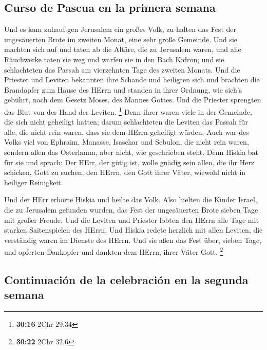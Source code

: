 \hypertarget{curso-de-pascua-en-la-primera-semana}{%
\subsection{Curso de Pascua en la primera
semana}\label{curso-de-pascua-en-la-primera-semana}}

 Und es kam zuhauf gen Jerusalem ein großes Volk, zu
halten das Fest der ungesäuerten Brote im zweiten Monat, eine sehr große
Gemeinde.  Und sie machten sich auf und taten ab die
Altäre, die zu Jerusalem waren, und alle Räuchwerke taten sie weg und
warfen sie in den Bach Kidron;  und sie schlachteten das
Passah am vierzehnten Tage des zweiten Monats. Und die Priester und
Leviten bekannten ihre Schande und heiligten sich und brachten die
Brandopfer zum Hause des HErrn  und standen in ihrer
Ordnung, wie sich's gebührt, nach dem Gesetz Moses, des Mannes Gottes.
Und die Priester sprengten das Blut von der Hand der Leviten.
\footnote{\textbf{30:16} 2Chr 29,34}  Denn ihrer waren
viele in der Gemeinde, die sich nicht geheiligt hatten; darum
schlachteten die Leviten das Passah für alle, die nicht rein waren, dass
sie dem HErrn geheiligt würden.  Auch war des Volks viel
von Ephraim, Manasse, Isaschar und Sebulon, die nicht rein waren,
sondern aßen das Osterlamm, aber nicht, wie geschrieben steht. Denn
Hiskia bat für sie und sprach: Der HErr, der gütig ist, wolle gnädig
sein  allen, die ihr Herz schicken, Gott zu suchen, den
HErrn, den Gott ihrer Väter, wiewohl nicht in heiliger Reinigkeit.

 Und der HErr erhörte Hiskia und heilte das Volk.
 Also hielten die Kinder Israel, die zu Jerusalem
gefunden wurden, das Fest der ungesäuerten Brote sieben Tage mit großer
Freude. Und die Leviten und Priester lobten den HErrn alle Tage mit
starken Saitenspielen des HErrn.  Und Hiskia redete
herzlich mit allen Leviten, die verständig waren im Dienste des HErrn.
Und sie aßen das Fest über, sieben Tage, und opferten Dankopfer und
dankten dem HErrn, ihrer Väter Gott. \footnote{\textbf{30:22} 2Chr 32,6}

\hypertarget{continuaciuxf3n-de-la-celebraciuxf3n-en-la-segunda-semana}{%
\subsection{Continuación de la celebración en la segunda
semana}\label{continuaciuxf3n-de-la-celebraciuxf3n-en-la-segunda-semana}}

